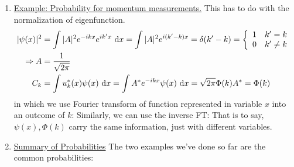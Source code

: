 \documentclass{school-22.101-notes}
\begin{document}
\begin{enumerate}
\item \uline{Example: Probability for momentum measurements.} This has to do with the normalization of eigenfunction. 
\begin{align}
|\psi (x)|^2 &= \int |A|^2 e^{-ikx} e^{ik^{\prime}x} \mbox{ }\mathrm{d} x = \int |A|^2 e^{i(k^{\prime}-k)x} = \delta(k^{\prime} - k) = \left\{ \begin{array}{cc}  1 & k^{\prime} = k  \\ 0 &  k^{\prime} \neq k   \end{array} \right. \\
\Rightarrow A &= \frac{1}{\sqrt{2 \pi}}  \\
 C_k &= \int  u_k^*(x) \psi(x) \mbox{ }\mathrm{d} x = \int  A^* e^{-ikx} \psi(x) \mbox{ }\mathrm{d} x = \sqrt{2 \pi} \Phi(k) A^* = \Phi(k)
\end{align}
in which we use Fourier transform of function represented in variable $x$ into an outcome of $k$:
Similarly, we can use the inverse FT:
That is to say, $\psi(x), \Phi(k)$ carry the same information, just with different variables. 


\item \uline{Summary of Probabilities}
The two examples we've done so far are the common probabilities:
\end{enumerate}
\end{document}
